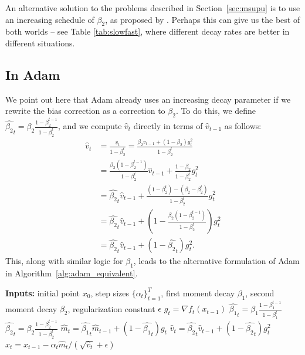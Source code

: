 \documentclass{article}
\begin{document}
An alternative solution to the problems described in Section~\ref{sec:msupu} is to use an increasing schedule of $\beta_2$, as proposed by \citet{Sashank18Convergence}.  Perhaps this can give us the best of both worlds -- see Table \ref{tab:slowfast}, where different decay rates are better in different situations.

\subsection{In Adam}

We point out here that Adam already uses an increasing decay parameter if we rewrite the bias correction as a correction to $\beta_2$.  To do this, we define $\hat{\beta_2}_t = \beta_2 \frac{1 - \beta_2^{t-1}}{1 - \beta_2^t}$, and we compute $\hat{v}_t$ directly in terms of $\hat{v}_{t-1}$ as follows:
%
\begin{align*}
\hat{v}_t & = \frac{v_t}{1 - \beta_2^t} = \frac{\beta_2 v_{t-1} + (1 - \beta_2) g_t^2}{1 - \beta_2^t} \\
& = \frac{\beta_2(1 - \beta_2^{t-1})}{1 - \beta_2^t}\hat{v}_{t-1}  + \frac{1 - \beta_2}{1 - \beta_2^t} g_t^2  \\
& = \hat{\beta_2}_t\hat{v}_{t-1}  + \frac{(1 - \beta_2^t) - (\beta_2 - \beta_2^t)}{1 - \beta_2^t} g_t^2  \\
& = \hat{\beta_2}_t\hat{v}_{t-1}  + \left(1 - \frac{\beta_2(1 - \beta_2^{t-1})}{1 - \beta_2^t}\right) g_t^2  \\
& = \hat{\beta_2}_t \hat{v}_{t-1} + (1 - \hat{\beta_2}_t) g_t^2  .
\end{align*}
%
This, along with similar logic for $\beta_1$, leads to the alternative formulation of Adam in Algorithm~\ref{alg:adam_equivalent}.

\begin{algorithm}
\begin{algorithmic}[1]
\STATE \textbf{Inputs:} initial point $x_0$, step sizes $\{\alpha_t\}_{t=1}^T$, first moment decay $\beta_1$, second moment decay $\beta_2$, regularization constant $\epsilon$
  \STATE $g_t = \nabla f_t(x_{t-1})$
  \STATE $\hat{\beta_1}_t = \beta_1 \frac{1 - \beta_1^{t-1}}{1 - \beta_1^t}$
  \STATE $\hat{\beta_2}_t = \beta_2 \frac{1 - \beta_2^{t-1}}{1 - \beta_2^t}$
  \STATE $\hat{m}_t = \hat{\beta_1}_t \hat{m}_{t-1} + (1 - \hat{\beta_1}_t) g_t$
  \STATE $\hat{v}_t = \hat{\beta_2}_t \hat{v}_{t-1} + (1 - \hat{\beta_2}_t) g_t^2$
  \STATE $x_t = x_{t-1} - \alpha_t \hat{m}_t / (\sqrt{\hat{v}_t} + \epsilon)$
\ENDFOR
\end{algorithmic}
\caption{Equivalent formulation of Adam where bias adjustments have been replaced by decay-rate adjustments.}
\label{alg:adam_equivalent}
\end{algorithm}
\end{document}
